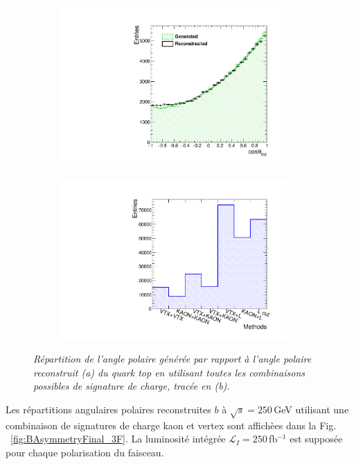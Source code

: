 \begin{figure}
	\centering
	\begin{subfigure}{0.5\textwidth}
		\includegraphics[width=0.95\textwidth]{ILD/plots/top-asymmetry-lepton.pdf}
		\caption{\label{fig:TopAsymmetryChi_a_3F} }
	\end{subfigure}%
	\begin{subfigure}{0.5\textwidth}
		\centering
		\includegraphics[width=0.95\textwidth]{ILD/plots/top-methods-lepton.pdf}
		\caption{\label{fig:TopAsymmetryChi_b_3F} }
	\end{subfigure}
	\caption{\sl Répartition de l'angle polaire générée par rapport à l'angle polaire reconstruit (a) du quark top en utilisant toutes les combinaisons possibles de signature de charge, tracée en (b).}
	\label{fig:TopAsymmetryChi_3F}
\end{figure}

Les répartitions angulaires polaires reconstruites $b$ à $\sqrt{s} = 250$\,GeV utilisant une combinaison de signatures de charge kaon et vertex sont affich\`ees dans la Fig. ~\ref{fig:BAsymmetryFinal_3F}. La luminosité intégrée $\mathcal{L}_I=250$\,fb$^{-1}$ est supposée pour chaque polarisation du faisceau.

